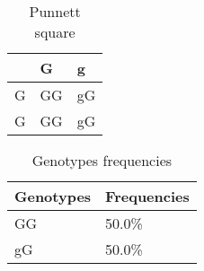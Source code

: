 \begin{table}[]
\centering
\caption{Punnett square}
\label{punnettsquare}
\begin{tabular}{l|ll}
\hline
& G & g \\ 
\hline
G & GG & gG \\ 
G & GG & gG 
\end{tabular}
\end{table}\begin{table}[]
\centering
\caption{Genotypes frequencies}
\label{genotypesfreq}
\begin{tabular}{ll}
\hline
Genotypes & Frequencies \\ \hline
GG & 50.0\% \\ \hline 
gG & 50.0\% \\ \hline 

\end{tabular}
\end{table}